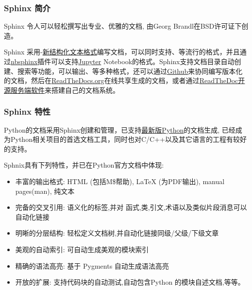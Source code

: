 \documentclass[letterpaper,10pt,english]{sphinxmanual}
\begin{document}
\subsubsection{Sphinx 简介}
\label{jupyter/sphinx_quickstart:Sphinx-_u7b80_u4ecb}
Sphinx 令人可以轻松撰写出专业、优雅的文档, 由Georg
Brandl在BSD许可证下创造。

Sphinx
采用-\href{http://docutils.sourceforge.net/rst.html}{新结构化文本格式}编写文档，可以同时支持、等流行的格式，并且通过\href{http://nbsphinx.readthedocs.io}{nbsphinx}插件可以支持\href{http://jupyter.readthedocs.org}{Jupyter}
Notebook的格式。Sphinx支持文档目录自动创建、搜索等功能，可以输出、等多种格式，还可以通过\href{http://github.com}{Github}来协同编写版本化的文档，然后在\href{http://ReadTheDocs.org}{ReadTheDocs.org}在线共享生成的文档，或者通过\href{https://github.com/rtfd/readthedocs.org}{ReadTheDoc开源服务端软件}来搭建自己的文档系统。


\subsubsection{Sphinx 特性}
\label{jupyter/sphinx_quickstart:Sphinx-_u7279_u6027}
Python的文档采用Sphinx创建和管理，已支持\href{http://docs.python.org/dev/}{最新版Python}的文档生成,
已经成为Python相关项目的首选文档工具，同时也对C/C++以及其它语言的工程有较好的支持。

Sphnix具有下列特性，并已在Python官方文档中体现:
\begin{itemize}
\item {} 
丰富的输出格式: HTML (包括M\$帮助), LaTeX (为PDF输出), manual
pages(man), 纯文本

\item {} 
完备的交叉引用: 语义化的标签,并对
函式,类,引文,术语以及类似片段消息可以自动化链接

\item {} 
明晰的分层结构: 轻松定义文档树,并自动化链接同级/父级/下级文章

\item {} 
美观的自动索引: 可自动生成美观的模块索引

\item {} 
精确的语法高亮: 基于 Pygments 自动生成语法高亮

\item {} 
开放的扩展: 支持代码块的自动测试,自动包含Python 的模块自述文档,等等。

\end{itemize}
\end{document}
